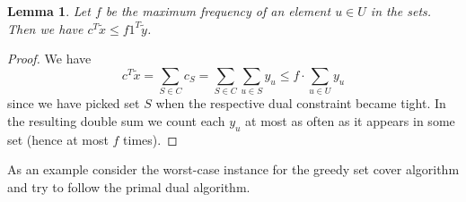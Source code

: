 \documentclass{article}
\newtheorem{lemma}{Lemma}
\begin{document}
\begin{lemma}
Let $f$ be the maximum frequency of an element $u\in U$ in the sets. Then we have 
$c^T\widetilde{x}\leq f 1^T\widetilde{y}$.
\end{lemma}
\begin{proof}
We have
\[
	c^T\widetilde{x} = \sum_{S\in C} c_S = \sum_{S\in C} \sum_{u\in S} y_u \leq f \cdot \sum_{u\in U} y_u
\]
since we have picked set $S$ when the respective dual constraint became tight. In the resulting double sum we count each $y_u$ at most as often as it appears in some set (hence at most $f$ times).
\end{proof}

As an example consider the worst-case instance for the greedy set cover algorithm and try to follow the primal dual algorithm.
\end{document}
